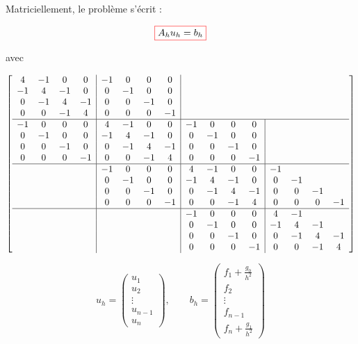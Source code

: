 \documentclass{beamer}
\newcommand{\myredbox}[1]{\fcolorbox{red}{white}{$\displaystyle#1$}}
\begin{document}
\begin{frame} 

 Matriciellement, le problème s'écrit : 
 
 \begin{equation}
 \myredbox{A_h u_h =b_h}
 \end{equation}
 
  avec
 

 
 \[
\left[\begin{array}{cccc|cccc|cccc|cccc}
4&-1&0&0&-1&0&0&0\\
-1&4&-1&0&0&-1&0&0\\
0&-1&4&-1&0&0&-1&0\\
0&0&-1&4&0&0&0&-1 \\ \hline
-1&0&0&0&4&-1&0&0&-1&0&0&0\\
0&-1&0&0&-1&4&-1&0&0&-1&0&0\\
0&0&-1&0&0&-1&4&-1&0&0&-1&0\\
0&0&0&-1&0&0&-1&4&0&0&0&-1\\ \hline
&&&&-1&0&0&0&4&-1&0&0&-1\\
&&&&0&-1&0&0&-1&4&-1&0&0&-1\\
&&&&0&0&-1&0&0&-1&4&-1&0&0&-1\\
&&&&0&0&0&-1&0&0&-1&4&0&0&0&-1\\ \hline
&&&&&&&&-1&0&0&0&4&-1\\
&&&&&&&&0&-1&0&0&-1&4&-1\\
&&&&&&&&0&0&-1&0&0&-1&4&-1\\
&&&&&&&&0&0&0&-1&0&0&-1&4
\end{array}\right]
\] 
 

\[u_h =\left(\begin{array}{c}
u_1\\u_2\\ \vdots \\ u_{n-1} \\ u_n
\end{array}\right), \qquad b_h =\left(\begin{array}{c}
f_1+\frac{g_0}{h^2}\\f_2\\ \vdots \\ f_{n-1} \\ f_n+\frac{g_1}{h^2}
\end{array}\right)
\]

\end{frame}
 
\end{document}
